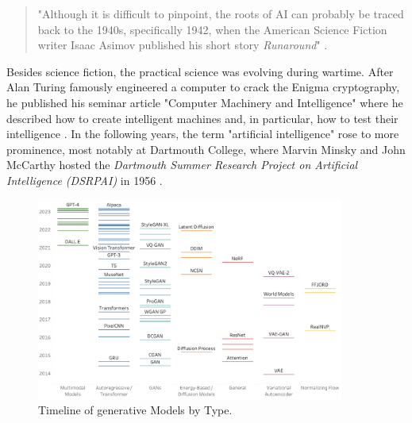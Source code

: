 \documentclass[
  a4paper,  %
  twoside,  %
  bibliography=totoc,
  headsepline,
  cleardoublepage=empty,
  parskip=half,
  draft=false
]{scrbook}
\begin{document}
\begin{quotation}
"Although it is difficult to pinpoint, the roots of AI can probably be traced back to the 1940s, specifically 1942, when the American Science Fiction writer Isaac Asimov published his short story \textit{Runaround}" \cite*{haenleinBriefHistoryArtificial2019}. 
\end{quotation}

Besides science fiction, the practical science was evolving during wartime. After Alan Turing famously engineered a computer to crack the Enigma cryptography, he published his seminar article "Computer Machinery and Intelligence" where he described how to create intelligent machines and, in particular, how to test their intelligence \cite{haenleinBriefHistoryArtificial2019}. In the following years, the term "artificial intelligence" rose to more prominence, most notably at Dartmouth College, where Marvin Minsky and John McCarthy hosted the \textit{Dartmouth Summer Research Project on Artificial Intelligence (DSRPAI)} in 1956 \cite{flasinskiHistoryArtificialIntelligence2016}. 

\begin{figure}[h]
  \centering
  \includegraphics[width=0.9\textwidth]{./graphics/Timeline_of_generative_models_by_type.png}
  \caption{Timeline of generative Models by Type. \citet{garcia-penalvoWhatWeMean2023}}
  \label{fig:timeline-models}
\end{figure}
\end{document}
